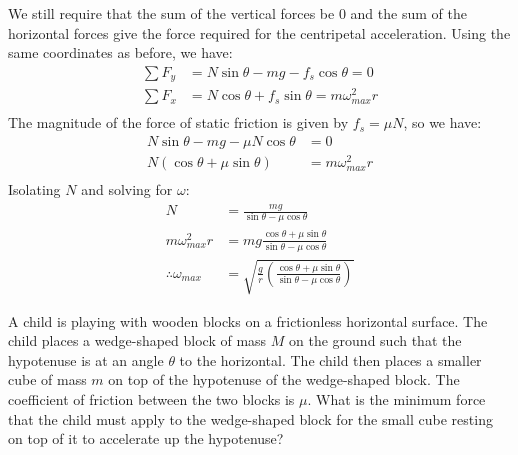 \begin{solution}
We still require that the sum of the vertical forces be 0 and the sum of the horizontal forces give the force required for the centripetal acceleration. Using the same coordinates as before, we have:
\begin{align*}
\sum F_y &= N\sin\theta-mg-f_s\cos\theta = 0 \\
\sum F_x &= N\cos\theta+f_s\sin\theta = m\omega_{max}^2 r \\
\end{align*}
The magnitude of the force of static friction is given by $f_s=\mu N$, so we have:
\begin{align*}
 N\sin\theta-mg-\mu N\cos\theta &= 0 \\
 N(\cos\theta+\mu\sin\theta) &= m\omega_{max}^2 r \\
\end{align*}
Isolating $N$ and solving for $\omega$:
\begin{align*}
N &= \frac{mg}{\sin\theta-\mu\cos\theta}\\
m\omega_{max}^2 r &= mg\frac{\cos\theta+\mu\sin\theta}{\sin\theta-\mu\cos\theta}\\
\therefore \omega_{max} &= \sqrt{\frac{g}{r}\left(\frac{\cos\theta+\mu\sin\theta}{\sin\theta-\mu\cos\theta}\right)}
\end{align*}
\end{solution}

\question A child is playing with wooden blocks on a frictionless horizontal surface. The child places a wedge-shaped block of mass $M$ on the ground such that the hypotenuse is at an angle $\theta$ to the horizontal. The child then places a smaller cube of mass $m$ on top of the hypotenuse of the wedge-shaped block. The coefficient of friction between the two blocks is $\mu$. What is the minimum force that the child must apply to the wedge-shaped block for the small cube resting on top of it to accelerate up the hypotenuse?

